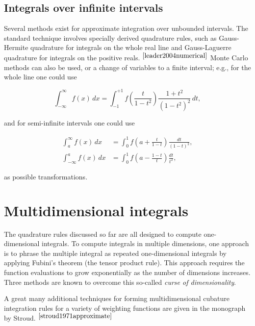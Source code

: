 \documentclass[a4paper]{article}
\begin{document}
\subsection{Integrals over infinite intervals}

Several methods exist for approximate integration over unbounded intervals. The standard technique involves specially derived quadrature rules, such as Gauss-Hermite quadrature for integrals on the whole real line and Gauss-Laguerre quadrature for integrals on the positive reals.$^{~\cite{leader2004numerical}}$ Monte Carlo methods can also be used, or a change of variables to a finite interval; e.g., for the whole line one could use

\begin{equation*}
	\int _{-\infty }^{\infty }f(x)\,dx=\int _{-1}^{+1}f\left({\frac {t}{1-t^{2}}}\right){\frac {1+t^{2}}{(1-t^{2})^{2}}}\,dt,
\end{equation*}

and for semi-infinite intervals one could use

\begin{equation*}
	\begin{aligned}
		\int _{a}^{\infty }f(x)\,dx&=\int _{0}^{1}f\left(a+{\frac {t}{1-t}}\right){\frac {dt}{(1-t)^{2}}},\\
		\int _{-\infty }^{a}f(x)\,dx&=\int _{0}^{1}f\left(a-{\frac {1-t}{t}}\right){\frac {dt}{t^{2}}},
	\end{aligned}
\end{equation*}

as possible transformations.

\section{Multidimensional integrals}
The quadrature rules discussed so far are all designed to compute one-dimensional integrals. To compute integrals in multiple dimensions, one approach is to phrase the multiple integral as repeated one-dimensional integrals by applying Fubini's theorem (the tensor product rule). This approach requires the function evaluations to grow exponentially as the number of dimensions increases. Three methods are known to overcome this so-called \textit{curse of dimensionality}.

A great many additional techniques for forming multidimensional cubature integration rules for a variety of weighting functions are given in the monograph by Stroud.$^{~\cite{stroud1971approximate}}$
\end{document}
